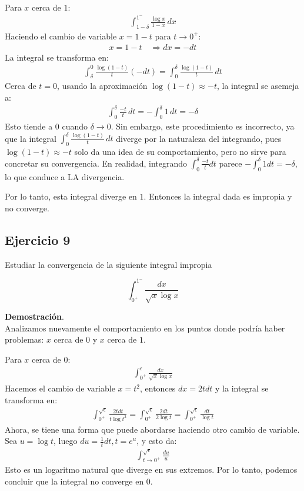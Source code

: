 \documentclass{article}
\begin{document}
    Para $x$ cerca de $1$:
    \begin{align*}
    \int_{1-\delta}^{1^-} \frac{\log x}{1-x} \, dx
    \end{align*}
    Haciendo el cambio de variable $x = 1 - t$ para $t \to 0^+$:
    \begin{align*}
    x = 1 - t \quad \Rightarrow dx = -dt
    \end{align*}
    La integral se transforma en:
    \begin{align*}
    \int_{\delta}^0 \frac{\log(1 - t)}{t} (-dt) = \int_0^\delta \frac{\log(1 - t)}{t} \, dt
    \end{align*}
    Cerca de $t = 0$, usando la aproximación $\log(1-t) \approx -t$, la integral se asemeja a:
    \begin{align*}
    \int_0^\delta \frac{-t}{t} \, dt = - \int_0^\delta 1 \, dt = -\delta
    \end{align*}
    Esto tiende a $0$ cuando $\delta \to 0$. Sin embargo, este procedimiento es incorrecto, ya que la integral $\int_0^\delta \frac{\log(1 - t)}{t} \, dt$ diverge por la naturaleza del integrando, pues $\log(1 - t) \approx -t$ solo da una idea de su comportamiento, pero no sirve para concretar su convergencia. En realidad, integrando $\int_0^\delta\frac{-t}{t}dt$ parece $-\int_0^\delta1dt=-\delta$, lo que conduce a LA divergencia.

    Por lo tanto, esta integral diverge en $1$. Entonces la integral dada es impropia y no converge.


    \subsection*{Ejercicio 9}

    Estudiar la convergencia de la siguiente integral impropia

    $$
    \int_{0^{+}}^{1^{-}} \frac{d x}{\sqrt{x} \log x}
    $$

    \textbf{Demostración}.\\

    Analizamos nuevamente el comportamiento en los puntos donde podría haber problemas: $x$ cerca de $0$ y $x$ cerca de $1$.

    Para $x$ cerca de $0$:
    \begin{align*}
    \int_{0^+}^\epsilon \frac{dx}{\sqrt{x} \log x}
    \end{align*}
    Hacemos el cambio de variable $x = t^2$, entonces $dx = 2t dt$ y la integral se transforma en:
    \begin{align*}
    \int_{0^+}^{\sqrt{\epsilon}} \frac{2t dt}{t \log t^2} = \int_{0^+}^{\sqrt{\epsilon}} \frac{2 dt}{2 \log t} = \int_{0^+}^{\sqrt{\epsilon}} \frac{dt}{\log t}
    \end{align*}
    Ahora, se tiene una forma que puede abordarse haciendo otro cambio de variable. Sea $u = \log t$, luego $du = \frac{1}{t} dt, t = e^u$, y esto da:
    \begin{align*}
    \int_{t \to 0^+}^{\sqrt{\epsilon}} \frac{du}{u}
    \end{align*}
    Esto es un logaritmo natural que diverge en sus extremos. Por lo tanto, podemos concluir que la integral no converge en $0$.
\end{document}

